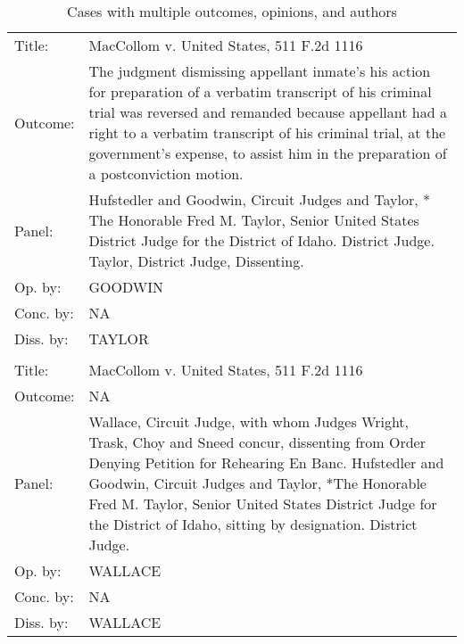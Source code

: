 \documentclass[10pt, letterpaper]{article}
\begin{document}
\begin{spacing}{1.0}
\begin{footnotesize}
    \begin{longtable}[H]{lp{6in}}
        \caption{Cases with multiple outcomes, opinions, and authors}\\[-4pt]
        \arrayrulecolor{black}\hline\\[-6pt]
        \endhead
        Title: & MacCollom v. United States, 511 F.2d 1116\\[2pt]
        Outcome: & The judgment dismissing appellant inmate's his action for preparation of a verbatim transcript of his criminal trial was reversed and remanded because appellant had a right to a verbatim transcript of his criminal trial, at the government's expense, to assist him in the preparation of a postconviction motion.\\[2pt]
        Panel: & Hufstedler and Goodwin, Circuit Judges and Taylor, * The Honorable Fred M. Taylor, Senior United States District Judge for the District of Idaho. District Judge. Taylor, District Judge, Dissenting. \\[2pt]
        Op. by: & GOODWIN \\[2pt]
        Conc. by: & NA\\[2pt]
        Diss. by: & TAYLOR \\[2pt]
        \arrayrulecolor{gray}\hline\\[-4pt]
        Title: & MacCollom v. United States, 511 F.2d 1116\\[2pt]
        Outcome: & NA\\[2pt]
        Panel: & Wallace, Circuit Judge, with whom Judges Wright, Trask, Choy and Sneed concur, dissenting from Order Denying Petition for Rehearing En Banc. Hufstedler and Goodwin, Circuit Judges and Taylor, *The Honorable Fred M. Taylor, Senior United States District Judge for the District of Idaho, sitting by designation. District Judge. \\[2pt]
        Op. by: &  WALLACE \\[2pt]
        Conc. by: & NA\\[2pt]
        Diss. by: & WALLACE \\[2pt]
        

\end{longtable}
\end{footnotesize}
\end{spacing}
\end{document}
